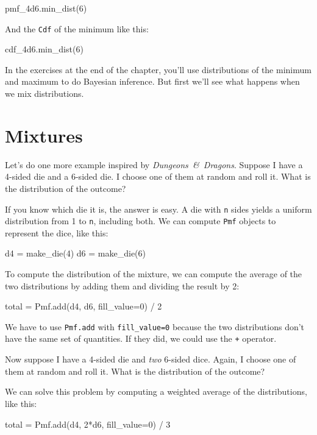 \documentclass[12pt]{book}
\theoremstyle{exercise}
\newcommand{\py}[1]{{\tt #1}}%
\begin{document}
\begin{code}
pmf_4d6.min_dist(6)
\end{code}

And the \py{Cdf} of the minimum like this:

\begin{code}
cdf_4d6.min_dist(6)
\end{code}

In the exercises at the end of the chapter, you'll use distributions of the minimum and maximum to do Bayesian inference.
But first we'll see what happens when we mix distributions.


\section{Mixtures}
\label{mixture}

Let's do one more example inspired by {\it Dungeons~\&~Dragons}.
Suppose I have a 4-sided die and a 6-sided die.
I choose one of them at random and roll it.
What is the distribution of the outcome?

If you know which die it is, the answer is easy.
A die with \py{n} sides yields a uniform distribution from 1 to \py{n}, including both.
We can compute \py{Pmf} objects to represent the dice, like this:

\begin{code}
d4 = make_die(4)
d6 = make_die(6)
\end{code}

To compute the distribution of the mixture, we can compute the average of the two distributions by adding them and dividing the result by 2:

\begin{code}
total = Pmf.add(d4, d6, fill_value=0) / 2
\end{code}

We have to use \py{Pmf.add} with \py{fill_value=0} because the two distributions don't have the same set of quantities.
If they did, we could use the \py{+} operator.

Now suppose I have a 4-sided die and {\it two} 6-sided dice.
Again, I choose one of them at random and roll it.
What is the distribution of the outcome?

We can solve this problem by computing a weighted average of the distributions, like this:

\begin{code}
total = Pmf.add(d4, 2*d6, fill_value=0) / 3
\end{code}
\end{document}
